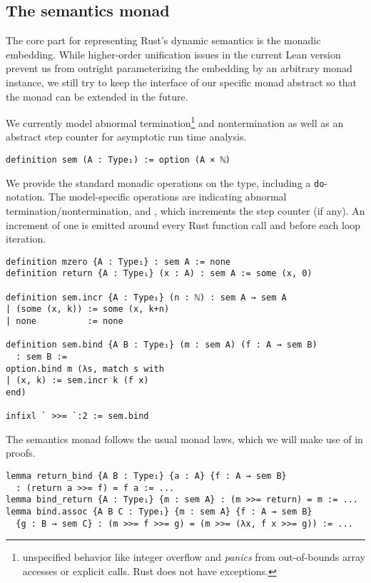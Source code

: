\subsection{The semantics monad}

The core part for representing Rust's dynamic semantics is the monadic embedding. While
higher-order unification issues in the current Lean version prevent us from
outright parameterizing the embedding by an arbitrary monad instance, we still
try to keep the interface of our specific monad abstract so that the monad can be
extended in the future.

We currently model abnormal termination\footnote{unspecified behavior like integer
overflow and \emph{panics} from out-of-bounds array accesses or explicit 
calls. Rust does not have exceptions.} and
nontermination as well as an abstract step counter for asymptotic run time analysis.

\begin{verbatim}
definition sem (A : Type₁) := option (A × ℕ)
\end{verbatim}

We provide the standard monadic operations on the type, including a
\texttt{do}-notation. The model-specific operations are 
indicating abnormal termination/nontermination, and , which
increments the step counter (if any). An increment of one is emitted around
every Rust function call and before each loop iteration.

\begin{verbatim}
definition mzero {A : Type₁} : sem A := none
definition return {A : Type₁} (x : A) : sem A := some (x, 0)

definition sem.incr {A : Type₁} (n : ℕ) : sem A → sem A
| (some (x, k)) := some (x, k+n)
| none          := none

definition sem.bind {A B : Type₁} (m : sem A) (f : A → sem B)
  : sem B :=
option.bind m (λs, match s with
| (x, k) := sem.incr k (f x)
end)

infixl ` >>= `:2 := sem.bind
\end{verbatim}

The semantics monad follows the usual monad laws, which we will make use of in proofs.

\begin{verbatim}
lemma return_bind {A B : Type₁} {a : A} {f : A → sem B}
  : (return a >>= f) = f a := ...
lemma bind_return {A : Type₁} {m : sem A} : (m >>= return) = m := ...
lemma bind.assoc {A B C : Type₁} {m : sem A} {f : A → sem B}
  {g : B → sem C} : (m >>= f >>= g) = (m >>= (λx, f x >>= g)) := ...
\end{verbatim}

